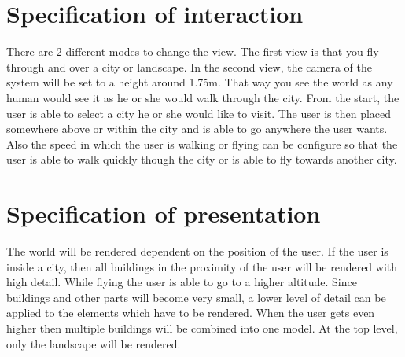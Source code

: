 \section{Specification of interaction}
There are 2 different modes to change the view. The first view is that you fly through and over a city or landscape. In the second view, the camera of the system will be set to a height around 1.75m. That way you see the world as any human would see it as he or she would walk through the city. From the start, the user is able to select a city he or she would like to visit. The user is then placed somewhere above or within the city and is able to go anywhere the user wants. Also the speed in which the user is walking or flying can be configure so that the user is able to walk quickly though the city or is able to fly towards another city.

\section{Specification of presentation}
The world will be rendered dependent on the position of the user. If the user is inside a city, then all buildings in the proximity of the user will be rendered with high detail. While flying the user is able to go to a higher altitude. Since buildings and other parts will become very small, a lower level of detail can be applied to the elements which have to be rendered. When the user gets even higher then multiple buildings will be combined into one model. At the top level, only the landscape will be rendered. 